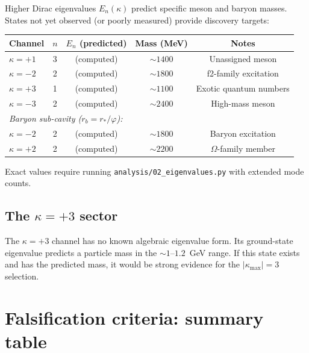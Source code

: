 \documentclass[11pt,letterpaper]{article}
\numberwithin{equation}{section}
\begin{document}
Higher Dirac eigenvalues $E_n(\kappa)$ predict specific meson and baryon
masses. States not yet observed (or poorly measured) provide discovery
targets:

\begin{longtable}{lcccc}
\toprule
Channel & $n$ & $E_n$ (predicted) & Mass (MeV) & Notes \\
\midrule
\endfirsthead
$\kappa=+1$ & 3 & (computed) & $\sim 1400$ & Unassigned meson \\
$\kappa=-2$ & 2 & (computed) & $\sim 1800$ & f2-family excitation \\
$\kappa=+3$ & 1 & (computed) & $\sim 1100$ & Exotic quantum numbers \\
$\kappa=-3$ & 2 & (computed) & $\sim 2400$ & High-mass meson \\
\midrule
\multicolumn{5}{l}{\textit{Baryon sub-cavity ($r_b = r_*/\varphi$):}} \\
$\kappa=-2$ & 2 & (computed) & $\sim 1800$ & Baryon excitation \\
$\kappa=+2$ & 2 & (computed) & $\sim 2200$ & $\Omega$-family member \\
\bottomrule
\end{longtable}

Exact values require running \texttt{analysis/02\_eigenvalues.py} with
extended mode counts.

\subsection{The $\kappa = +3$ sector}

The $\kappa = +3$ channel has no known algebraic eigenvalue form. Its
ground-state eigenvalue predicts a particle mass in the $\sim 1$--$1.2$~GeV
range. If this state exists and has the predicted mass, it would be strong
evidence for the $|\kappa_\mathrm{max}| = 3$ selection.

\section{Falsification criteria: summary table}
\label{sec:falsification}
\end{document}
